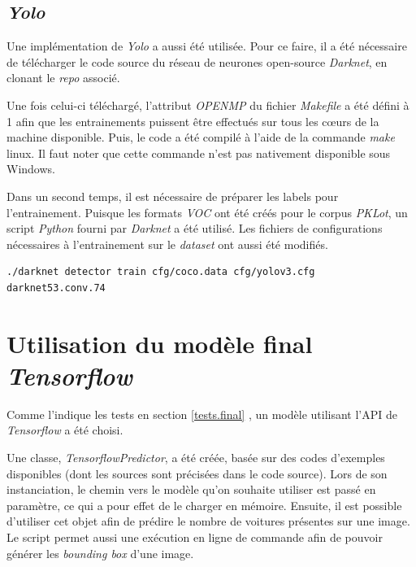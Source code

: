\subsection{\textit{Yolo}}
Une implémentation de \textit{Yolo} a aussi été utilisée. Pour ce faire, il a été nécessaire de télécharger le code source du réseau de neurones open-source \textit{Darknet}\autocite{lib:yolo}, en clonant le \textit{repo} associé.

Une fois celui-ci téléchargé, l'attribut \textit{OPENMP} du fichier \textit{Makefile} a été défini à 1 afin que les entrainements puissent être effectués sur tous les cœurs de la machine disponible. Puis, le code a été compilé à l'aide de la commande \textit{make} linux. Il faut noter que cette commande n'est pas nativement disponible sous Windows.

Dans un second temps, il est nécessaire de préparer les labels pour l'entrainement. Puisque les formats \textit{VOC} ont été créés pour le corpus \textit{PKLot}, un script \textit{Python} fourni par \textit{Darknet} a été utilisé. Les fichiers de configurations nécessaires à l'entrainement sur le \textit{dataset} ont aussi été modifiés. 

\begin{lstlisting}[caption={Exécution d'un entrainement à l'aide de \textit{Yolo}}, label={lst:yolo_train}, numbers=none] 
./darknet detector train cfg/coco.data cfg/yolov3.cfg darknet53.conv.74
\end{lstlisting}


\section{Utilisation du modèle final \textit{Tensorflow}} 
Comme l'indique les tests en section \ref{tests.final} , un modèle utilisant l'API de \textit{Tensorflow} a été choisi. 

Une classe, \textit{TensorflowPredictor}, a été créée, basée sur des codes d'exemples disponibles (dont les sources sont précisées dans le code source). Lors de son instanciation, le chemin vers le modèle qu'on souhaite utiliser est passé en paramètre, ce qui a pour effet de le charger en mémoire. Ensuite, il est possible d'utiliser cet objet afin de prédire le nombre de voitures présentes sur une image. Le script permet aussi une exécution en ligne de commande afin de pouvoir générer les \textit{bounding box} d'une image.